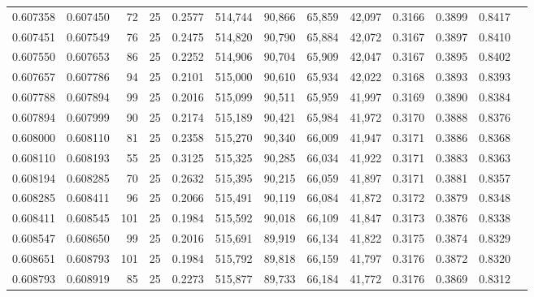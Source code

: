 \begin{tabular}{rrrrrrrrrrrrr}
0.607358 & 0.607450 &    72 &  25 &                                     0.2577 & 514,744 &  90,866 &  65,859 &  42,097 & 0.3166 & 0.3899 & 0.8417 \\
0.607451 & 0.607549 &    76 &  25 &                                     0.2475 & 514,820 &  90,790 &  65,884 &  42,072 & 0.3167 & 0.3897 & 0.8410 \\
0.607550 & 0.607653 &    86 &  25 &                                     0.2252 & 514,906 &  90,704 &  65,909 &  42,047 & 0.3167 & 0.3895 & 0.8402 \\
0.607657 & 0.607786 &    94 &  25 &                                     0.2101 & 515,000 &  90,610 &  65,934 &  42,022 & 0.3168 & 0.3893 & 0.8393 \\
0.607788 & 0.607894 &    99 &  25 &                                     0.2016 & 515,099 &  90,511 &  65,959 &  41,997 & 0.3169 & 0.3890 & 0.8384 \\
0.607894 & 0.607999 &    90 &  25 &                                     0.2174 & 515,189 &  90,421 &  65,984 &  41,972 & 0.3170 & 0.3888 & 0.8376 \\
0.608000 & 0.608110 &    81 &  25 &                                     0.2358 & 515,270 &  90,340 &  66,009 &  41,947 & 0.3171 & 0.3886 & 0.8368 \\
0.608110 & 0.608193 &    55 &  25 &                                     0.3125 & 515,325 &  90,285 &  66,034 &  41,922 & 0.3171 & 0.3883 & 0.8363 \\
0.608194 & 0.608285 &    70 &  25 &                                     0.2632 & 515,395 &  90,215 &  66,059 &  41,897 & 0.3171 & 0.3881 & 0.8357 \\
0.608285 & 0.608411 &    96 &  25 &                                     0.2066 & 515,491 &  90,119 &  66,084 &  41,872 & 0.3172 & 0.3879 & 0.8348 \\
0.608411 & 0.608545 &   101 &  25 &                                     0.1984 & 515,592 &  90,018 &  66,109 &  41,847 & 0.3173 & 0.3876 & 0.8338 \\
0.608547 & 0.608650 &    99 &  25 &                                     0.2016 & 515,691 &  89,919 &  66,134 &  41,822 & 0.3175 & 0.3874 & 0.8329 \\
0.608651 & 0.608793 &   101 &  25 &                                     0.1984 & 515,792 &  89,818 &  66,159 &  41,797 & 0.3176 & 0.3872 & 0.8320 \\
0.608793 & 0.608919 &    85 &  25 &                                     0.2273 & 515,877 &  89,733 &  66,184 &  41,772 & 0.3176 & 0.3869 & 0.8312 \\

\end{tabular}
